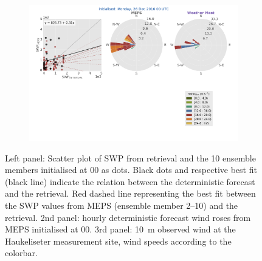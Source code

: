 \begin{figure}
	\newline
	\begin{subfigure}[b]{0.84\textwidth}
		\includegraphics[trim={2.3cm 19.5cm 2.cm .7cm},clip,width=\textwidth]{./fig_windrose/20161226}
		\caption{}\label{fig:wind26}
	\end{subfigure}
	\caption{Left panel: Scatter plot of SWP from retrieval and the \num{10} ensemble members initialised at \SI{00}{\UTC} as dots. Black dots and respective best fit (black line) indicate the relation between the deterministic forecast and the retrieval. Red dashed line representing the best fit between the SWP values from MEPS (ensemble member \numrange{2}{10}) and the retrieval. 2nd panel: hourly deterministic forecast wind roses from MEPS initialised at \SI{00}{\UTC}. 3rd panel: \SI{10}{\metre} observed wind at the Haukeliseter measurement site, wind speeds according to the colorbar. }\label{fig:SWP_wind}
\end{figure}